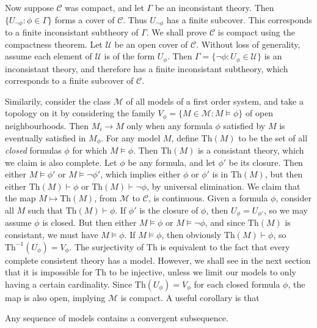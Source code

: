 Now suppose $\mathcal{C}$ was compact, and let $\Gamma$ be an inconsistant theory. Then $\{ U_{\neg \phi} : \phi \in \Gamma \}$ forms a cover of $\mathcal{C}$.  Thus $U_{\neg \phi}$ has a finite subcover. This corresponds to a finite inconsistant subtheory of $\Gamma$. We shall prove $\mathcal{C}$ is compact using the compactness theorem. Let $\mathcal{U}$ be an open cover of $\mathcal{C}$. Without loss of generality, assume each element of $\mathcal{U}$ is of the form $U_\phi$. Then $\Gamma = \{ \neg \phi : U_\phi \in \mathcal{U} \}$ is an inconsistant theory, and therefore has a finite inconsistant subtheory, which corresponds to a finite subcover of $\mathcal{C}$.

Similarily, consider the class $\mathcal{M}$ of all models of a first order system, and take a topology on it by considering the family $V_\phi = \{ M \in \mathcal{M} : M \vDash \phi \}$ of open neighbourhoods. Then $M_i \to M$ only when any formula $\phi$ satisfied by $M$ is eventually satisfied in $M_\phi$. For any model $M$, define $\text{Th}(M)$ to be the set of all {\it closed} formulas $\phi$ for which $M \vDash \phi$. Then $\text{Th}(M)$ is a consistant theory, which we claim is also complete. Let $\phi$ be any formula, and let $\phi'$ be its closure. Then either $M \vDash \phi'$ or $M \vDash \neg \phi'$, which implies either $\phi$ or $\phi'$ is in $\text{Th}(M)$, but then either $\text{Th}(M) \vdash \phi$ or $\text{Th}(M) \vdash \neg \phi$, by universal elimination. We claim that the map $M \mapsto \text{Th}(M)$, from $\mathcal{M}$ to $\mathcal{C}$, is continuous. Given a formula $\phi$, consider all $M$ such that $\text{Th}(M) \vdash \phi$. If $\phi'$ is the closure of $\phi$, then $U_\phi = U_{\phi'}$, so we may assume $\phi$ is closed. But then either $M \vDash \phi$ or $M \vDash \neg \phi$, and since $\text{Th}(M)$ is consistant, we must have $M \vDash \phi$. If $M \vDash \phi$, then obviously $\text{Th}(M) \vdash \phi$, so $\text{Th}^{-1}(U_\phi) = V_\phi$. The surjectivity of $\text{Th}$ is equivalent to the fact that every complete consistent theory has a model. However, we shall see in the next section that it is impossible for $\text{Th}$ to be injective, unless we limit our models to only having a certain cardinality. Since $\text{Th}(U_\phi) = V_\phi$ for each closed formula $\phi$, the map is also open, implying $\mathcal{M}$ is compact. A useful corollary is that

\begin{theorem}
    Any sequence of models contains a convergent subsequence.
\end{theorem}

